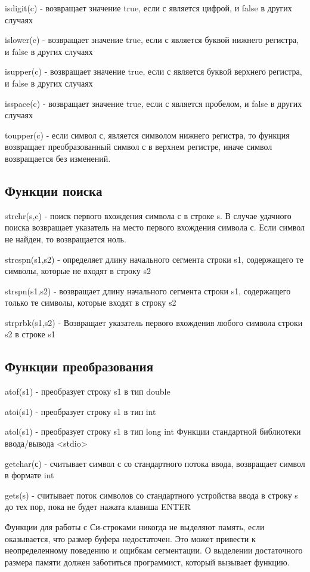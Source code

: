 isdigit(c) - возвращает значение true, если с является цифрой, и false в других случаях

islower(c) - возвращает значение true, если с является буквой нижнего регистра, и false в других случаях

isupper(c) - возвращает значение true, если с является буквой верхнего регистра, и false в других случаях

isspace(c) - возвращает значение true, если с является пробелом, и false в других случаях

toupper(c) - если символ с, является символом нижнего регистра, то функция возвращает преобразованный символ
с в верхнем регистре, иначе символ возвращается без изменений.
\subsection*{Функции поиска}

strchr(s,c) -  поиск первого вхождения символа с в строке s. В случае удачного поиска возвращает указатель
на место первого вхождения символа с. Если символ не найден, то возвращается ноль.

strcspn(s1,s2) - определяет длину начального сегмента строки s1, содержащего те символы, которые не входят в строку s2

strspn(s1,s2) - возвращает длину начального сегмента строки s1, содержащего только те символы, которые входят в строку s2

strprbk(s1,s2) - Возвращает указатель  первого вхождения любого символа строки s2 в строке s1

\subsection*{Функции преобразования}

atof(s1) - преобразует строку s1 в тип double

atoi(s1) - преобразует строку s1 в тип int

atol(s1) - преобразует строку s1 в тип long int
Функции стандартной библиотеки ввода/вывода <stdio>

getchar(с) - считывает символ с со стандартного потока ввода, возвращает символ в формате int

gets(s) - считывает поток символов со стандартного устройства ввода в строку s до тех пор, пока не будет нажата клавиша ENTER

\vspace{1cm}

Функции для работы с Си-строками никогда не выделяют память, если оказывается, что размер буфера недостаточен. Это 
может привести к неопределенному поведению и ощибкам сегментации. О выделении
достаточного размера памяти должен заботиться программист, который вызывает функцию.

